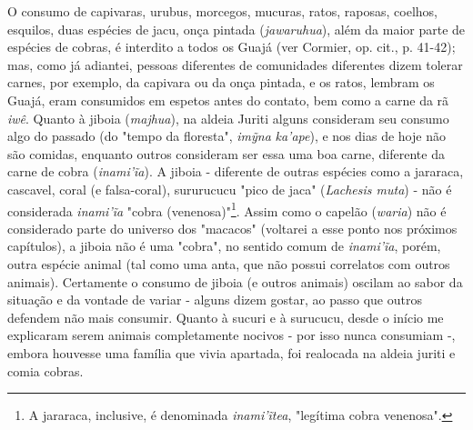 O consumo de capivaras, urubus, morcegos, mucuras, ratos, raposas,
coelhos, esquilos, duas espécies de jacu, onça pintada
(\emph{jawaruhua}), além da maior parte de espécies de cobras, é
interdito a todos os Guajá (ver Cormier, op. cit., p. 41-42); mas, como
já adiantei, pessoas diferentes de comunidades diferentes dizem tolerar
carnes, por exemplo, da capivara ou da onça pintada, e os ratos, lembram
os Guajá, eram consumidos em espetos antes do contato, bem como a carne
da rã \emph{iwê}. Quanto à jiboia (\emph{majhua}), na aldeia Juriti
alguns consideram seu consumo algo do passado (do "tempo da floresta",
\emph{imỹna} \emph{ka'ape}), e nos dias de hoje não são comidas,
enquanto outros consideram ser essa uma boa carne, diferente da carne de
cobra (\emph{inami'ĩa}). A jiboia - diferente de outras espécies como a
jararaca, cascavel, coral (e falsa-coral), sururucucu "pico de jaca"
(\emph{Lachesis muta}) - não é considerada \emph{inami'ĩa} "cobra
(venenosa)"\footnote{A jararaca, inclusive, é denominada
  \emph{inami'ĩtea}, "legítima cobra venenosa".}. Assim como o capelão
(\emph{waria}) não é considerado parte do universo dos "macacos"
(voltarei a esse ponto nos próximos capítulos), a jiboia não é uma
"cobra", no sentido comum de \emph{inami'ĩa}, porém, outra espécie
animal (tal como uma anta, que não possui correlatos com outros
animais). Certamente o consumo de jiboia (e outros animais) oscilam ao
sabor da situação e da vontade de variar - alguns dizem gostar, ao passo
que outros defendem não mais consumir. Quanto à sucuri e à surucucu,
desde o início me explicaram serem animais completamente nocivos - por
isso nunca consumiam -, embora houvesse uma família que vivia apartada,
foi realocada na aldeia juriti e comia cobras.

